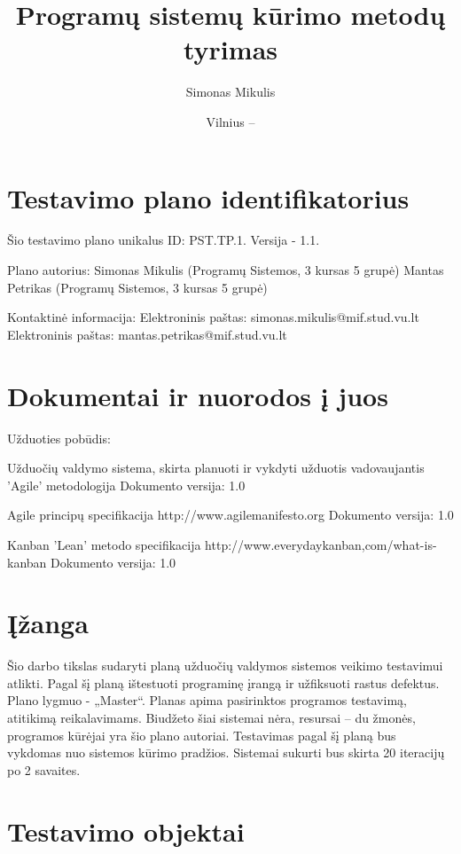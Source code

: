 \documentclass{VUMIFPSkursinis}
\title{Programų sistemų kūrimo metodų tyrimas}
\author{Simonas Mikulis}
\date{Vilnius – \the\year}
\begin{document}
      \maketitle
    
      \tableofcontents
  
    \section{Testavimo plano identifikatorius}
    
    Šio testavimo plano unikalus ID: PST.TP.1.  Versija - 1.1.
    
    Plano autorius: 
    Simonas Mikulis (Programų Sistemos, 3 kursas 5 grupė)
    Mantas Petrikas (Programų Sistemos, 3 kursas 5 grupė)
    
    Kontaktinė informacija:
    Elektroninis paštas: simonas.mikulis@mif.stud.vu.lt
    Elektroninis paštas: mantas.petrikas@mif.stud.vu.lt
    
    
    \section{Dokumentai ir nuorodos į juos}
    
    Užduoties pobūdis:
    
    Užduočių valdymo sistema, skirta planuoti ir vykdyti užduotis vadovaujantis 'Agile' metodologija
    Dokumento versija: 1.0
    
    Agile principų specifikacija
    http://www.agilemanifesto.org
    Dokumento versija: 1.0
    
    Kanban 'Lean' metodo specifikacija
    http://www.everydaykanban,com/what-is-kanban
    Dokumento versija: 1.0
    
    
    \section{Įžanga}
    
    Šio darbo tikslas sudaryti planą užduočių valdymos sistemos veikimo testavimui atlikti.
    Pagal šį planą ištestuoti programinę įrangą ir užfiksuoti rastus defektus.
    Plano lygmuo - „Master“. Planas apima pasirinktos programos testavimą, atitikimą reikalavimams. 
    Biudžeto šiai sistemai nėra, resursai – du žmonės, programos kūrėjai yra šio plano autoriai. 
    Testavimas pagal šį planą bus vykdomas nuo sistemos kūrimo pradžios. Sistemai sukurti bus skirta 20 iteracijų po 2 savaites.
    
    
    \section{Testavimo objektai}
    
\end{document}
